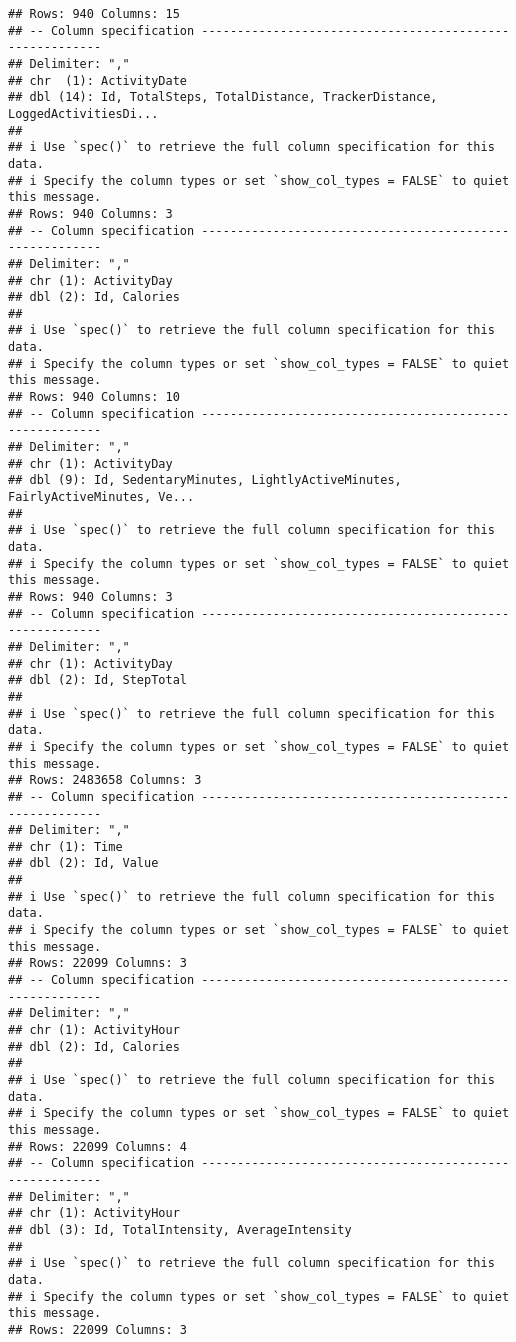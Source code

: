 \documentclass[
]{article}
\begin{document}
\begin{verbatim}
## Rows: 940 Columns: 15
## -- Column specification --------------------------------------------------------
## Delimiter: ","
## chr  (1): ActivityDate
## dbl (14): Id, TotalSteps, TotalDistance, TrackerDistance, LoggedActivitiesDi...
## 
## i Use `spec()` to retrieve the full column specification for this data.
## i Specify the column types or set `show_col_types = FALSE` to quiet this message.
## Rows: 940 Columns: 3
## -- Column specification --------------------------------------------------------
## Delimiter: ","
## chr (1): ActivityDay
## dbl (2): Id, Calories
## 
## i Use `spec()` to retrieve the full column specification for this data.
## i Specify the column types or set `show_col_types = FALSE` to quiet this message.
## Rows: 940 Columns: 10
## -- Column specification --------------------------------------------------------
## Delimiter: ","
## chr (1): ActivityDay
## dbl (9): Id, SedentaryMinutes, LightlyActiveMinutes, FairlyActiveMinutes, Ve...
## 
## i Use `spec()` to retrieve the full column specification for this data.
## i Specify the column types or set `show_col_types = FALSE` to quiet this message.
## Rows: 940 Columns: 3
## -- Column specification --------------------------------------------------------
## Delimiter: ","
## chr (1): ActivityDay
## dbl (2): Id, StepTotal
## 
## i Use `spec()` to retrieve the full column specification for this data.
## i Specify the column types or set `show_col_types = FALSE` to quiet this message.
## Rows: 2483658 Columns: 3
## -- Column specification --------------------------------------------------------
## Delimiter: ","
## chr (1): Time
## dbl (2): Id, Value
## 
## i Use `spec()` to retrieve the full column specification for this data.
## i Specify the column types or set `show_col_types = FALSE` to quiet this message.
## Rows: 22099 Columns: 3
## -- Column specification --------------------------------------------------------
## Delimiter: ","
## chr (1): ActivityHour
## dbl (2): Id, Calories
## 
## i Use `spec()` to retrieve the full column specification for this data.
## i Specify the column types or set `show_col_types = FALSE` to quiet this message.
## Rows: 22099 Columns: 4
## -- Column specification --------------------------------------------------------
## Delimiter: ","
## chr (1): ActivityHour
## dbl (3): Id, TotalIntensity, AverageIntensity
## 
## i Use `spec()` to retrieve the full column specification for this data.
## i Specify the column types or set `show_col_types = FALSE` to quiet this message.
## Rows: 22099 Columns: 3

\end{verbatim}
\end{document}
